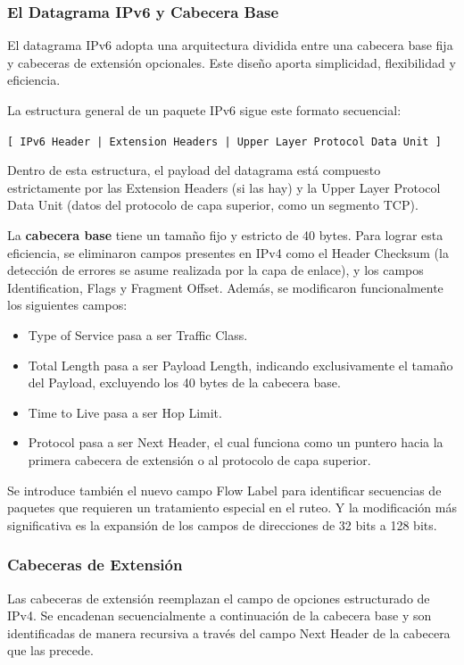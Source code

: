 \subsubsection{El Datagrama IPv6 y Cabecera Base}

El datagrama IPv6 adopta una arquitectura dividida entre una cabecera base fija y cabeceras de extensión opcionales. Este diseño aporta simplicidad, flexibilidad y eficiencia.

La estructura general de un paquete IPv6 sigue este formato secuencial:
\begin{center}
    \texttt{[ IPv6 Header | Extension Headers | Upper Layer Protocol Data Unit ]}
\end{center}

Dentro de esta estructura, el payload del datagrama está compuesto estrictamente por las Extension Headers (si las hay) y la Upper Layer Protocol Data Unit (datos del protocolo de capa superior, como un segmento TCP). 

La \textbf{cabecera base} tiene un tamaño fijo y estricto de 40 bytes. Para lograr esta eficiencia, se eliminaron campos presentes en IPv4 como el Header Checksum (la detección de errores se asume realizada por la capa de enlace), y los campos Identification, Flags y Fragment Offset. Además, se modificaron funcionalmente los siguientes campos:
\begin{itemize}
    \item Type of Service pasa a ser Traffic Class.
    \item Total Length pasa a ser Payload Length, indicando exclusivamente el tamaño del Payload, excluyendo los 40 bytes de la cabecera base.
    \item Time to Live pasa a ser Hop Limit.
    \item Protocol pasa a ser Next Header, el cual funciona como un puntero hacia la primera cabecera de extensión o al protocolo de capa superior.
\end{itemize}
Se introduce también el nuevo campo Flow Label para identificar secuencias de paquetes que requieren un tratamiento especial en el ruteo. Y la modificación más significativa es la expansión de los campos de direcciones de 32 bits a 128 bits.

\subsubsection{Cabeceras de Extensión}

Las cabeceras de extensión reemplazan el campo de opciones estructurado de IPv4. Se encadenan secuencialmente a continuación de la cabecera base y son identificadas de manera recursiva a través del campo Next Header de la cabecera que las precede.

